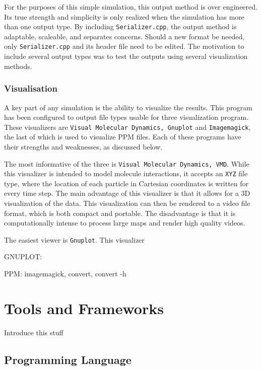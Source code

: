 \documentclass[a4paper,11pt]{article}
\begin{document}
For the purposes of this simple simulation, this output method is over engineered.  Its true strength and simplicity is only realized when the simulation has more than one output type.  By including \texttt{Serializer.cpp}, the output method is adaptable, scaleable, and separates concerns.  Should a new format be needed, only \texttt{Serializer.cpp} and its header file need to be edited.  The motivation to include several output types was to test the outputs using several visualization methods.

\subsubsection{Visualisation}

A key part of any simulation is the ability to visualize the results.  This program has been configured to output file types usable for three visualization program.  These visualizers are \texttt{Visual Molecular Dynamics, Gnuplot} and \texttt{Imagemagick}, the last of which is used to visualize PPM files.  Each of these programs have their strengths and weaknesses, as discussed below. 

The most informative of the three is \texttt{Visual Molecular Dynamics, VMD}.  While this visualizer is intended to model molecule interactions, it accepts an \texttt{XYZ} file type, where the location of each particle in Cartesian coordinates is written for every time step.  The main advantage of this visualizer is that it allows for a 3D visualization of the data.  This visualization can then be rendered to a video file format, which is both compact and portable.  The disadvantage is that it is computationally intense to process large maps and render high quality videos.  

The easiest viewer is \texttt{Gnuplot}.  This visualizer 


GNUPLOT:

PPM:  imagemagick, convert, convert -h

\section{Tools and Frameworks}

Introduce this stuff

\subsection{Programming Language}
\end{document}
